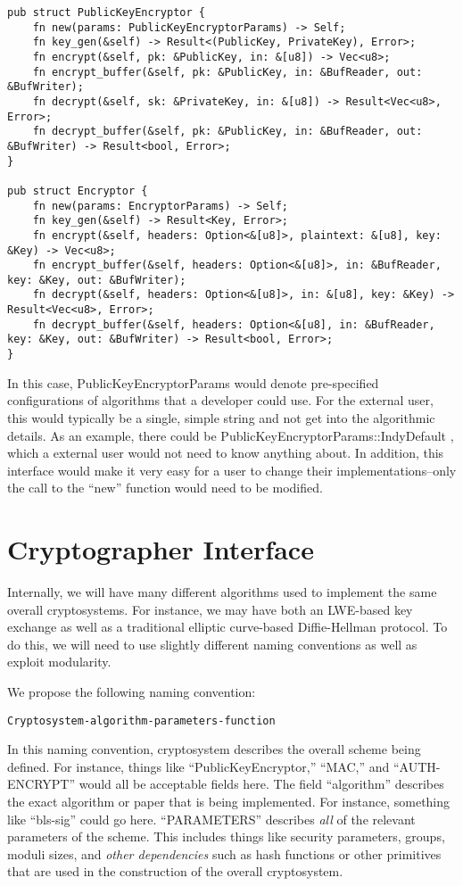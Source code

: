 \begin{verbatim}
pub struct PublicKeyEncryptor {
    fn new(params: PublicKeyEncryptorParams) -> Self;
    fn key_gen(&self) -> Result<(PublicKey, PrivateKey), Error>;
    fn encrypt(&self, pk: &PublicKey, in: &[u8]) -> Vec<u8>;
    fn encrypt_buffer(&self, pk: &PublicKey, in: &BufReader, out: &BufWriter);
    fn decrypt(&self, sk: &PrivateKey, in: &[u8]) -> Result<Vec<u8>, Error>;
    fn decrypt_buffer(&self, pk: &PublicKey, in: &BufReader, out: &BufWriter) -> Result<bool, Error>;
}

pub struct Encryptor {
    fn new(params: EncryptorParams) -> Self;
    fn key_gen(&self) -> Result<Key, Error>;
    fn encrypt(&self, headers: Option<&[u8]>, plaintext: &[u8], key: &Key) -> Vec<u8>;
    fn encrypt_buffer(&self, headers: Option<&[u8]>, in: &BufReader, key: &Key, out: &BufWriter);
    fn decrypt(&self, headers: Option<&[u8]>, in: &[u8], key: &Key) -> Result<Vec<u8>, Error>;
    fn decrypt_buffer(&self, headers: Option<&[u8], in: &BufReader, key: &Key, out: &BufWriter) -> Result<bool, Error>;
}
\end{verbatim}

In this case, PublicKeyEncryptorParams would denote pre-specified configurations of algorithms that a developer could use.  For the external user, this would typically be a single, simple string and not get into the algorithmic details.  As an example, there could be PublicKeyEncryptorParams::IndyDefault , which a external user would not need to know anything about.  In addition, this interface would make it very easy for a user to change their implementations--only the call to the ``new'' function would need to be modified.


\section{Cryptographer Interface}
Internally, we will have many different algorithms used to implement the same overall cryptosystems.  For instance, we may have both an LWE-based key exchange as well as a traditional elliptic curve-based Diffie-Hellman protocol.  To do this, we will need to use slightly different naming conventions as well as exploit modularity.

We propose the following naming convention:
\begin{verbatim}
Cryptosystem-algorithm-parameters-function
\end{verbatim}

In this naming convention, cryptosystem describes the overall scheme being defined.  For instance, things like ``PublicKeyEncryptor,'' ``MAC,'' and ``AUTH-ENCRYPT'' would all be acceptable fields here.  The field ``algorithm'' describes the exact algorithm or paper that is being implemented.  For instance, something like ``bls-sig'' could go here.  ``PARAMETERS'' describes \emph{all} of the relevant parameters of the scheme.  This includes things like security parameters, groups, moduli sizes, and \emph{other dependencies} such as hash functions or other primitives that are used in the construction of the overall cryptosystem.

